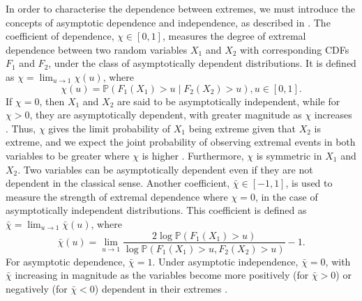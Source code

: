 \documentclass{article}
\numberwithin{equation}{section}
\begin{document}
In order to characterise the dependence between extremes, we must introduce the concepts of asymptotic dependence and independence, as described in \citet{Coles1999}.
The coefficient of dependence, $\chi \in [0, 1]$, measures the degree of extremal dependence between two random variables $X_1$ and $X_2$ with corresponding CDFs $F_1$ and $F_2$, under the class of asymptotically dependent distributions.
It is defined as $\chi = \lim_{u \rightarrow 1}{\chi(u)}$, where
\[
  \chi(u) = \mathbb{P}\left( F_1(X_1) > u \mid F_2(X_2) > u \right), u \in [0, 1].
\]
If $\chi = 0$, then $X_1$ and $X_2$ are said to be asymptotically independent, while for $\chi > 0$, they are asymptotically dependent, with greater magnitude as $\chi$ increases \cite{Coles1999}.
Thus, $\chi$ gives the limit probability of $X_1$ being extreme given that $X_2$ is extreme, and we expect the joint probability of observing extremal events in both variables to be greater where $\chi$ is higher \cite{Rohrbeck2021}.
Furthermore, $\chi$ is symmetric in $X_1$ and $X_2$.
Two variables can be asymptotically dependent even if they are not dependent in the classical sense.
Another coefficient, $\bar{\chi} \in [-1, 1]$, is used to measure the strength of extremal dependence where $\chi = 0$, in the case of asymptotically independent distributions.
This coefficient is defined as $\bar{\chi} = \lim_{u \rightarrow 1}{\bar{\chi}(u)}$, where
\[
  \bar{\chi}(u) = \lim_{u \rightarrow 1} \frac{2\log\mathbb{P}(F_1(X_1) > u)}{ \log{\mathbb{P}(F_1(X_1) > u, F_2(X_2) > u)}} - 1.
\]
For asymptotic dependence, $\bar{\chi} = 1$.
Under asymptotic independence, $\bar{\chi} = 0$, with $\bar{\chi}$ increasing in magnitude as the variables become more positively (for $\bar{\chi} > 0$) or negatively (for $\bar{\chi} < 0$) dependent in their extremes \cite{Vignotto2021}.
\end{document}
